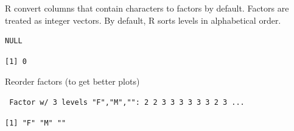 \documentclass[
  letterpaper,
  DIV=11,
  numbers=noendperiod]{scrreprt}
\newenvironment{Shaded}{\begin{snugshade}}{\end{snugshade}}
\newcommand{\AttributeTok}[1]{\textcolor[rgb]{0.40,0.45,0.13}{#1}}
\newcommand{\FunctionTok}[1]{\textcolor[rgb]{0.28,0.35,0.67}{#1}}
\newcommand{\NormalTok}[1]{\textcolor[rgb]{0.00,0.23,0.31}{#1}}
\newcommand{\OtherTok}[1]{\textcolor[rgb]{0.00,0.23,0.31}{#1}}
\newcommand{\SpecialCharTok}[1]{\textcolor[rgb]{0.37,0.37,0.37}{#1}}
\newcommand{\StringTok}[1]{\textcolor[rgb]{0.13,0.47,0.30}{#1}}
\begin{document}
R convert columns that contain characters to factors by default. Factors
are treated as integer vectors. By default, R sorts levels in
alphabetical order.

\begin{Shaded}
\end{Shaded}

\begin{verbatim}
NULL
\end{verbatim}

\begin{Shaded}
\end{Shaded}

\begin{verbatim}
[1] 0
\end{verbatim}

Reorder factors (to get better plots)

\begin{Shaded}
\end{Shaded}

\begin{verbatim}
 Factor w/ 3 levels "F","M","": 2 2 3 3 3 3 3 3 2 3 ...
\end{verbatim}

\begin{Shaded}
\end{Shaded}

\begin{verbatim}
[1] "F" "M" "" 
\end{verbatim}
\end{document}
